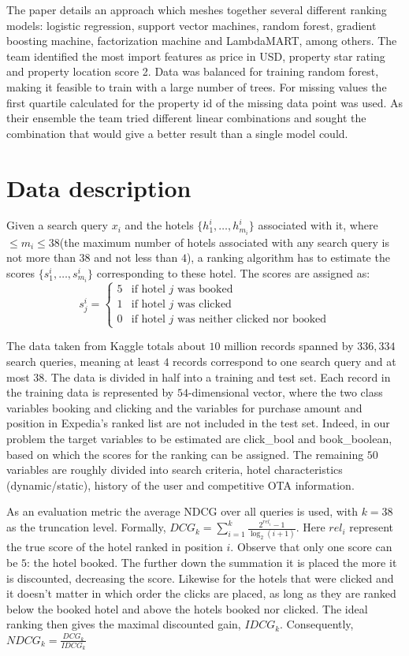 \documentclass{llncs}
\begin{document}
The paper \cite{DBLP:journals/corr/LiuXZYPLSW13} details an approach which meshes together several different ranking models: logistic regression, support vector machines, random forest, gradient boosting machine, factorization machine and LambdaMART, among others. The team identified the most import features as price in USD, property star rating and property location score 2. Data was balanced for training random forest, making it feasible to train with a large number of trees.  For missing values the first quartile calculated for the property id of the missing data point was used. As their ensemble the team tried different linear combinations and sought the combination that would give a better result than a single model could.
 
\section{Data description}
Given a search query $x_{i}$ and the hotels $\{h_{1}^{i},\dots,h_{m_{i}}^{i}\}$ associated with it, where $\leq m_{i} \leq 38$(the maximum number of hotels associated with any search query is not more than $38$ and not less than $4$), a ranking algorithm has to estimate the scores  $\{s_{1}^{i},\dots,s_{m_{i}}^{i}\}$ corresponding to these hotel. The scores are assigned as:
$$
s_{j}^{i}=
\left\{
	\begin{array}{ll}
		5  & \mbox{if hotel $j$ was booked }   \\
		1 & \mbox{if hotel $j$ was clicked }  \\
		0 & \mbox{if hotel $j$ was neither clicked nor booked}
	\end{array}
\right.
$$
  
The data taken from Kaggle totals about $10$ million records spanned by $336,334$ search queries, meaning at least $4$ records correspond to one search query and at most $38$. The data is divided in half into a training and test set. Each record in the training data is represented by $54$-dimensional vector, where the two class variables booking and clicking and the variables for purchase amount and position in Expedia's ranked list are not included in the test set. Indeed, in our problem the target variables to be estimated are click\_bool and book\_boolean, based on which the scores for the ranking can be assigned. The remaining $50$ variables are roughly divided into search criteria, hotel characteristics (dynamic/static), history of the user and competitive OTA information.

As an evaluation metric the average NDCG over all queries is used, with $k=38$ as the truncation level. Formally, $\displaystyle DCG_{k}=\sum_{i=1}^{k}\frac{2^{rel_i}-1}{\log_{2}(i+1)}$. Here $rel_{i}$ represent the true score of the hotel ranked in position $i$. Observe that only one score can be $5$: the hotel booked. The further down the summation it is placed the more it is discounted, decreasing the score. Likewise for the hotels that were clicked and it doesn't matter in which order the clicks are placed, as long as they are ranked below the booked hotel and above the hotels booked nor clicked. The ideal ranking then gives the maximal discounted gain, $IDCG_{k}$. Consequently, $NDCG_{k}=\frac{DCG_{k}}{IDCG_{k}}$ 
\end{document}
